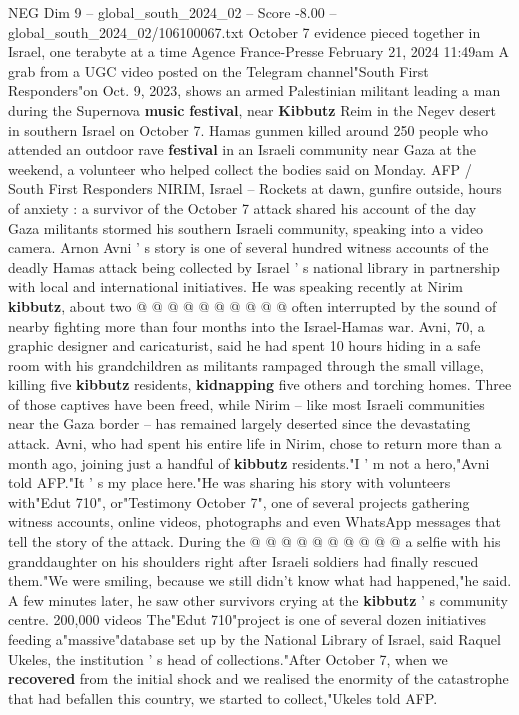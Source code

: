 \begin{textsample}{NEG Dim 9 – global\_south\_2024\_02 – Score -8.00 – global\_south\_2024\_02/106100067.txt}  \label{ex:f9_neg_341}
October 7 evidence pieced together in Israel, one terabyte at a time Agence France-Presse February 21, 2024 11:49am A grab from a UGC video posted on the Telegram channel"South First Responders"on Oct. 9, 2023, shows an armed Palestinian militant leading a man during the Supernova \textbf{music} \textbf{festival}, near \textbf{Kibbutz} Reim in the Negev desert in southern Israel on October 7.
Hamas gunmen killed around 250 people who attended an outdoor rave \textbf{festival} in an Israeli community near Gaza at the weekend, a volunteer who helped collect the bodies said on Monday.
AFP / South First Responders NIRIM, Israel -- Rockets at dawn, gunfire outside, hours of anxiety : a survivor of the October 7 attack shared his account of the day Gaza militants stormed his southern Israeli community, speaking into a video camera.
Arnon Avni ' s story is one of several hundred witness accounts of the deadly Hamas attack being collected by Israel ' s national library in partnership with local and international initiatives.
He was speaking recently at Nirim \textbf{kibbutz}, about two @ @ @ @ @ @ @ @ @ @ often interrupted by the sound of nearby fighting more than four months into the Israel-Hamas war.
Avni, 70, a graphic designer and caricaturist, said he had spent 10 hours hiding in a safe room with his grandchildren as militants rampaged through the small village, killing five \textbf{kibbutz} residents, \textbf{kidnapping} five others and torching homes.
Three of those captives have been freed, while Nirim -- like most Israeli communities near the Gaza border -- has remained largely deserted since the devastating attack.
Avni, who had spent his entire life in Nirim, chose to return more than a month ago, joining just a handful of \textbf{kibbutz} residents."I ' m not a hero,"Avni told AFP."It ' s my place here."He was sharing his story with volunteers with"Edut 710", or"Testimony October 7", one of several projects gathering witness accounts, online videos, photographs and even WhatsApp messages that tell the story of the attack.
During the @ @ @ @ @ @ @ @ @ @ a selfie with his granddaughter on his shoulders right after Israeli soldiers had finally rescued them."We were smiling, because we still didn't know what had happened,"he said.
A few minutes later, he saw other survivors crying at the \textbf{kibbutz} ' s community centre. 200,000 videos The"Edut 710"project is one of several dozen initiatives feeding a"massive"database set up by the National Library of Israel, said Raquel Ukeles, the institution ' s head of collections."After October 7, when we \textbf{recovered} from the initial shock and we realised the enormity of the catastrophe that had befallen this country, we started to collect,"Ukeles told AFP.

\end{textsample}

